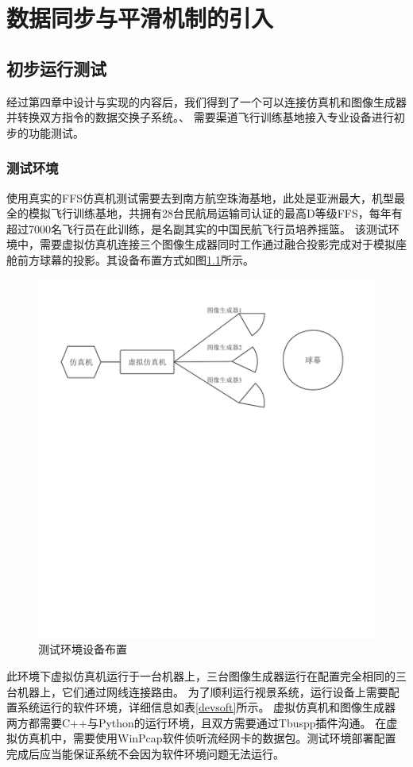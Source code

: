 \chapter{数据同步与平滑机制的引入}
\section{初步运行测试}
经过第四章中设计与实现的内容后，我们得到了一个可以连接仿真机和图像生成器并转换双方指令的数据交换子系统。、
需要渠道飞行训练基地接入专业设备进行初步的功能测试。
\subsection{测试环境}
使用真实的FFS仿真机测试需要去到南方航空珠海基地，此处是亚洲最大，机型最全的模拟飞行训练基地，共拥有28台民航局运输司认证的最高D等级FFS，每年有超过7000名飞行员在此训练，是名副其实的中国民航飞行员培养摇篮。
该测试环境中，需要虚拟仿真机连接三个图像生成器同时工作通过融合投影完成对于模拟座舱前方球幕的投影。其设备布置方式如图\ref{testenv}所示。
\begin{figure}[h!]
    \begin{center}
        \includegraphics[width=\textwidth]{pictures/testenv.pdf}
        \caption{测试环境设备布置}
        \label{testenv}
    \end{center}
\end{figure}
\par
此环境下虚拟仿真机运行于一台机器上，三台图像生成器运行在配置完全相同的三台机器上，它们通过网线连接路由。
为了顺利运行视景系统，运行设备上需要配置系统运行的软件环境，详细信息如表\ref{devsoft}所示。
虚拟仿真机和图像生成器两方都需要C++与Python的运行环境，且双方需要通过Tbuspp插件沟通。
在虚拟仿真机中，需要使用WinPcap软件侦听流经网卡的数据包。测试环境部署配置完成后应当能保证系统不会因为软件环境问题无法运行。

